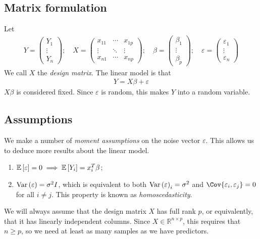 \subsection{Matrix formulation}
Let
\begin{align*}
	Y = \begin{pmatrix}
		Y_1    \\
		\vdots \\
		Y_n
	\end{pmatrix};\quad X = \begin{pmatrix}
		x_{11} & \cdots & x_{1p} \\
		\vdots & \ddots & \vdots \\
		x_{n1} & \cdots & x_{np}
	\end{pmatrix};\quad \beta = \begin{pmatrix}
		\beta_1 \\
		\vdots  \\
		\beta_p
	\end{pmatrix};\quad \varepsilon = \begin{pmatrix}
		\varepsilon_1 \\
		\vdots        \\
		\varepsilon_n
	\end{pmatrix}
\end{align*}
We call $X$ the \textit{design matrix}.
The linear model is that
\begin{align*}
	Y = X\beta + \varepsilon
\end{align*}
$X\beta$ is considered fixed.
Since $\varepsilon$ is random, this makes $Y$ into a random variable.

\subsection{Assumptions}
We make a number of \textit{moment assumptions} on the noise vector $\varepsilon$.
This allows us to deduce more results about the linear model.
\begin{enumerate}
	\item $\mathbb{E}\left[{\varepsilon}\right] = 0 \implies \mathbb{E}\left[{Y_i}\right] = x_i^T \beta$;
	\item $\operatorname{Var}\left({\varepsilon}\right) = \sigma^2 I$, which is equivalent to both $\operatorname{Var}\left({\varepsilon}\right)_i = \sigma^2$ and $\Cov{\varepsilon_i, \varepsilon_j} = 0$ for all $i \neq j$.
	      This property is known as \textit{homoscedasticity}.
\end{enumerate}
We will always assume that the design matrix $X$ has full rank $p$, or equivalently, that it has linearly independent columns.
Since $X \in \mathbb R^{n \times p}$, this requires that $n \geq p$, so we need at least as many samples as we have predictors.


